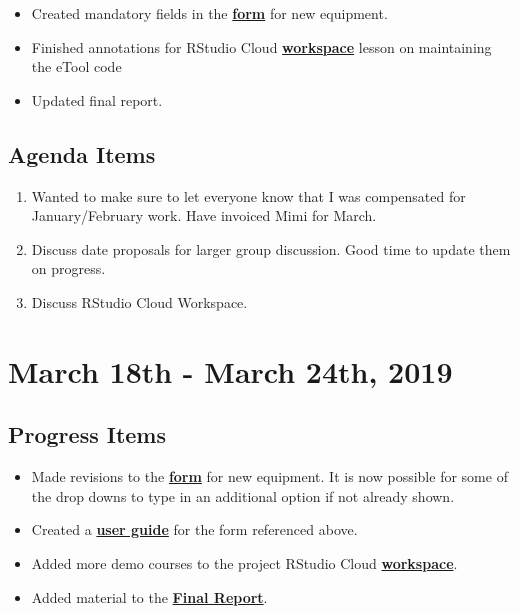 \documentclass[]{article}
\providecommand{\tightlist}{%
  \setlength{\itemsep}{0pt}\setlength{\parskip}{0pt}}
\begin{document}
\begin{itemize}
\tightlist
\item
  Created mandatory fields in the
  \textbf{\href{https://travis-shinin-spot.shinyapps.io/new_equip_form/}{form}}
  for new equipment.
\item
  Finished annotations for RStudio Cloud
  \textbf{\href{https://rstudio.cloud/project/255745}{workspace}} lesson
  on maintaining the eTool code
\item
  Updated final report.
\end{itemize}

\hypertarget{agenda-items-1}{%
\subsection{Agenda Items}\label{agenda-items-1}}

\begin{enumerate}
\def\labelenumi{\arabic{enumi}.}
\tightlist
\item
  Wanted to make sure to let everyone know that I was compensated for
  January/February work. Have invoiced Mimi for March.
\item
  Discuss date proposals for larger group discussion. Good time to
  update them on progress.
\item
  Discuss RStudio Cloud Workspace.
\end{enumerate}

\hypertarget{march-18th---march-24th-2019}{%
\section{March 18th - March 24th,
2019}\label{march-18th---march-24th-2019}}

\hypertarget{progress-items-2}{%
\subsection{Progress Items}\label{progress-items-2}}

\begin{itemize}
\tightlist
\item
  Made revisions to the
  \textbf{\href{https://travis-shinin-spot.shinyapps.io/new_equip_form/}{form}}
  for new equipment. It is now possible for some of the drop downs to
  type in an additional option if not already shown.
\item
  Created a
  \textbf{\href{https://github.com/paceafenet/etool_dev/blob/master/New\%20Equipment\%20Form\%20User\%20Guide.pdf}{user
  guide}} for the form referenced above.
\item
  Added more demo courses to the project RStudio Cloud
  \textbf{\href{https://rstudio.cloud/project/255745}{workspace}}.
\item
  Added material to the
  \textbf{\href{https://paceafenet.github.io/final_report/}{Final
  Report}}.
\end{itemize}
\end{document}
